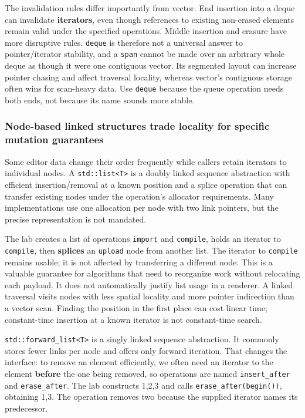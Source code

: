 The invalidation rules differ importantly from vector. End insertion into a deque can invalidate \textbf{iterators}, even though references to existing non-erased elements remain valid under the specified operations. Middle insertion and erasure have more disruptive rules. \texttt{deque} is therefore not a universal answer to pointer/iterator stability, and a \texttt{span} cannot be made over an arbitrary whole deque as though it were one contiguous vector. Its segmented layout can increase pointer chasing and affect traversal locality, whereas vector's contiguous storage often wins for scan-heavy data. Use \texttt{deque} because the queue operation needs both ends, not because its name sounds more stable.

\subsubsection{Node-based linked structures trade locality for specific mutation guarantees}\label{node-based-linked-structures-trade-locality-for-specific-mutation-guarantees}

Some editor data change their order frequently while callers retain iterators to individual nodes. A \texttt{std::list\textless{}T\textgreater{}} is a doubly linked sequence abstraction with efficient insertion/removal at a known position and a splice operation that can transfer existing nodes under the operation's allocator requirements. Many implementations use one allocation per node with two link pointers, but the precise representation is not mandated.

The lab creates a list of operations \texttt{import} and \texttt{compile}, holds an iterator to \texttt{compile}, then \textbf{splices} an \texttt{upload} node from another list. The iterator to \texttt{compile} remains usable; it is not affected by transferring a different node. This is a valuable guarantee for algorithms that need to reorganize work without relocating each payload. It does not automatically justify list usage in a renderer. A linked traversal visits nodes with less spatial locality and more pointer indirection than a vector scan. Finding the position in the first place can cost linear time; constant-time insertion at a known iterator is not constant-time search.

\texttt{std::forward\_list\textless{}T\textgreater{}} is a singly linked sequence abstraction. It commonly stores fewer links per node and offers only forward iteration. That changes the interface: to remove an element efficiently, we often need an iterator to the element \textbf{before} the one being removed, so operations are named \texttt{insert\_after} and \texttt{erase\_after}. The lab constructs 1,2,3 and calls \texttt{erase\_after(begin())}, obtaining 1,3. The operation removes two because the supplied iterator names its predecessor.


